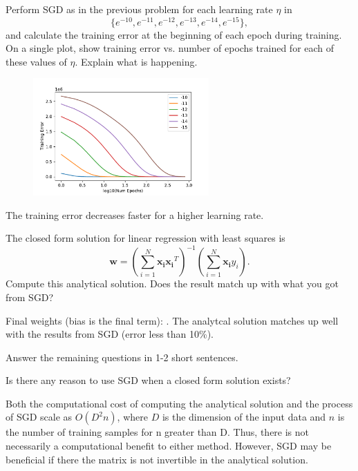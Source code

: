 \begin{problem}[2]
  Perform SGD as in the previous problem for each learning rate $\eta$ in \[\{e^{-10}, e^{-11}, e^{-12}, e^{-13}, e^{-14}, e^{-15}\},\] and calculate the training error at the beginning of each epoch during training.  On a single plot, show training error vs. number of epochs trained for each of these values of $\eta$. Explain what is happening.
\end{problem}
\begin{solution}
  \begin{figure}[H]
    \centering
    \includegraphics[width=0.6\textwidth]{images/fig3.pdf}
  \end{figure}
  The training error decreases faster for a higher learning rate.
\end{solution}


\begin{problem}[2]
  The closed form solution for linear regression with least squares is \[\mathbf{w} = \left(\sum_{i=1}^N \mathbf{x_i}\mathbf{x_i}^T\right)^{-1}\left(\sum_{i=1}^N \mathbf{x_i}y_i\right).\]  Compute this analytical solution.  Does the result match up with what you got from SGD?
\end{problem}
\begin{solution}
  Final weights (bias is the final term): \newline
  [ -5.99157048,   4.01509955, -11.93325972,   8.99061096,
  -0.31644251]. The analytcal solution matches up well with the results from SGD (error less than 10\%).
\end{solution}

Answer the remaining questions in 1-2 short sentences.

\begin{problem}[2]
  Is there any reason to use SGD when a closed form solution exists?
\end{problem}
\begin{solution}
  Both the computational cost of computing the analytical solution and the process of SGD scale as $O(D^2n)$, where $D$ is the dimension of the input data and $n$ is the number of training samples for n greater than D. Thus, there is not necessarily a computational benefit to either method. However, SGD may be beneficial if there the matrix is not invertible in the analytical solution.
\end{solution}

